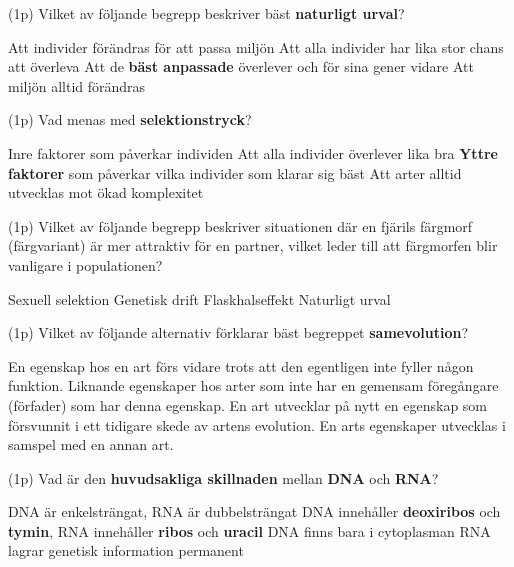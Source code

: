 \documentclass{exam}
\begin{document}
\begin{questions}
\question (1p) Vilket av följande begrepp beskriver bäst \textbf{naturligt urval}?
\begin{checkboxes}
    \choice Att individer förändras för att passa miljön
    \choice Att alla individer har lika stor chans att överleva
    \correctchoice Att de \textbf{bäst anpassade} överlever och för sina gener vidare
    \choice Att miljön alltid förändras
\end{checkboxes}
\vspace{5mm}

\question (1p) Vad menas med \textbf{selektionstryck}?
\begin{checkboxes}
    \choice Inre faktorer som påverkar individen
    \choice Att alla individer överlever lika bra
    \correctchoice \textbf{Yttre faktorer} som påverkar vilka individer som klarar sig bäst
    \choice Att arter alltid utvecklas mot ökad komplexitet
\end{checkboxes}
\vspace{5mm}

\question (1p) Vilket av följande begrepp beskriver situationen där en fjärils färgmorf (färgvariant) är mer attraktiv för en partner, vilket leder till att färgmorfen blir vanligare i populationen?
\begin{checkboxes}
    \correctchoice Sexuell selektion
    \choice Genetisk drift
    \choice Flaskhalseffekt
    \choice Naturligt urval
\end{checkboxes}
\vspace{5mm}

\question (1p) Vilket av följande alternativ förklarar bäst begreppet \textbf{samevolution}?
\begin{checkboxes}
\choice En egenskap hos en art förs vidare trots att den egentligen inte fyller någon funktion.
\choice Liknande egenskaper hos arter som inte har en gemensam föregångare (förfader) som har denna egenskap.
\choice En art utvecklar på nytt en egenskap som försvunnit i ett tidigare skede av artens evolution.
\correctchoice En arts egenskaper utvecklas i samspel med en annan art.
\end{checkboxes}
\vspace{5mm}
\break
\question (1p) Vad är den \textbf{huvudsakliga skillnaden} mellan \textbf{DNA} och \textbf{RNA}?
\begin{checkboxes}
    \choice DNA är enkelsträngat, RNA är dubbelsträngat
    \correctchoice DNA innehåller \textbf{deoxiribos} och \textbf{tymin}, RNA innehåller \textbf{ribos} och \textbf{uracil}
    \choice DNA finns bara i cytoplasman
    \choice RNA lagrar genetisk information permanent
\end{checkboxes}
\vspace{5mm}


\end{questions}
\end{document}
